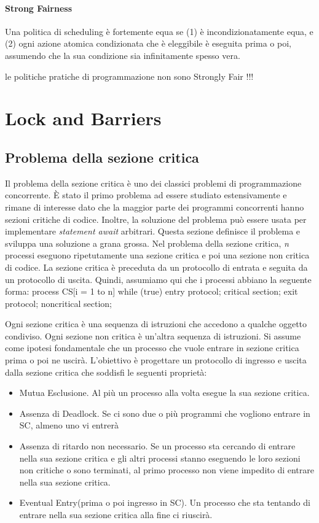 \documentclass[10pt,a4paper]{article}
\begin{document}
\paragraph{Strong Fairness} Una politica di scheduling è fortemente equa se (1) è incondizionatamente equa, e (2) ogni azione atomica condizionata che è eleggibile è eseguita prima o poi, assumendo che la sua condizione sia infinitamente spesso vera.

le politiche pratiche di programmazione non sono Strongly Fair !!!

\section{Lock and Barriers}


\subsection{Problema della sezione critica}
Il problema della sezione critica è uno dei classici problemi di programmazione concorrente. È stato il primo problema ad essere studiato estensivamente e rimane di interesse dato che la maggior parte dei programmi concorrenti hanno sezioni critiche di codice. Inoltre, la soluzione del problema può essere usata per implementare \textit{statement await} arbitrari.
Questa sezione definisce il problema e sviluppa una soluzione a grana grossa.
Nel problema della sezione critica, \textit{n} processi eseguono ripetutamente una sezione critica e poi
una sezione non critica di codice. La sezione critica è preceduta da un protocollo di entrata e seguita da un protocollo di uscita. Quindi, assumiamo qui che i processi abbiano la seguente forma:
process CS[i = 1 to n] {
while (true) {
entry protocol;
critical section;
exit protocol;
noncritical section;
}
}

Ogni sezione critica è una sequenza di istruzioni che accedono a qualche oggetto condiviso.
Ogni sezione non critica è un'altra sequenza di istruzioni.
Si assume come ipotesi fondamentale che un processo che vuole entrare in sezione critica prima o poi ne uscirà.
L'obiettivo è progettare un protocollo di ingresso e uscita dalla sezione critica che soddisfi le seguenti proprietà:
\begin{itemize}
\item Mutua Esclusione. Al più un processo alla volta esegue la sua sezione critica.
\item Assenza di Deadlock. Se ci sono due o più programmi che vogliono entrare in SC, almeno uno vi entrerà
\item Assenza di ritardo non necessario. Se un processo sta cercando di entrare nella sua sezione critica
e gli altri processi stanno eseguendo le loro sezioni non critiche o sono terminati, al primo processo non viene impedito di entrare nella sua sezione critica.
\item Eventual Entry(prima o poi ingresso in SC). Un processo che sta tentando di entrare nella sua sezione critica alla fine ci riuscirà.
\end{itemize}
\end{document}
